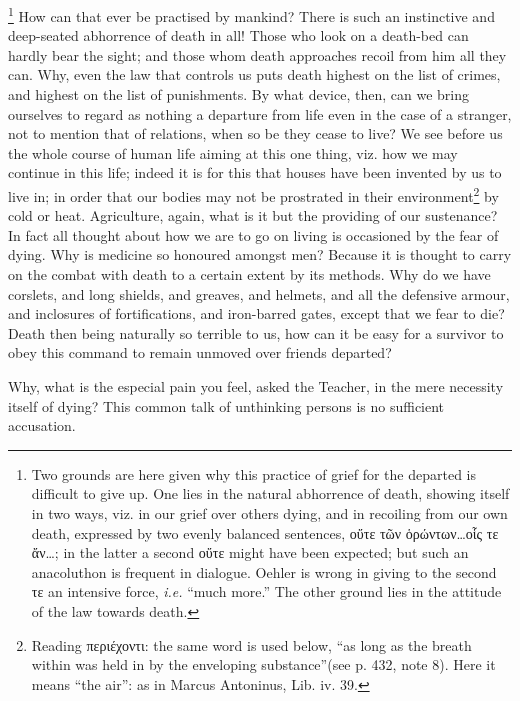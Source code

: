 \footnote{Two grounds are here given why this practice of grief for the departed is difficult to give up. One lies in the natural abhorrence of death, showing itself in two ways, viz. in our grief over others dying, and in recoiling from our own death, expressed by two evenly balanced sentences, \textgreek{οὔτε τῶν ὁρώντων…οἷς τε ἄν…}; in the latter a second \textgreek{οὔτε} might have been expected; but such an anacoluthon is frequent in dialogue. Oehler is wrong in giving to the second \textgreek{τε} an intensive force, \emph{i.e.} “much more.” The other ground lies in the attitude of the law towards death.} How can that ever be practised by mankind? There is such an instinctive and deep-seated abhorrence of death in all! Those who look on a death-bed can hardly bear the sight; and those whom death approaches recoil from him all they can. Why, even the law that controls us puts death highest on the list of crimes, and highest on the list of punishments. By what device, then, can we bring ourselves to regard as nothing a departure from life even in the case of a stranger, not to mention that of relations, when so be they cease to live? We see before us the whole course of human life aiming at this one thing, viz. how we may continue in this life; indeed it is for this that houses have been invented by us to live in; in order that our bodies may not be prostrated in their environment\footnote{Reading \textgreek{περιέχοντι}: the same word is used below, “as long as the breath within was held in by the enveloping substance”(see p. 432, note 8). Here it means “the air”: as in Marcus Antoninus, Lib. iv. 39.} by cold or heat. Agriculture, again, what is it but the providing of our sustenance? In fact all thought about how we are to go on living is occasioned by the fear of dying. Why is medicine so honoured amongst men? Because it is thought to carry on the combat with death to a certain extent by its methods. Why do we have corslets, and long shields, and greaves, and helmets, and all the defensive armour, and inclosures of fortifications, and iron-barred gates, except that we fear to die? Death then being naturally so terrible to us, how can it be easy for a survivor to obey this command to remain unmoved over friends departed?

Why, what is the especial pain you feel, asked the Teacher, in the mere necessity itself of dying? This common talk of unthinking persons is no sufficient accusation.

